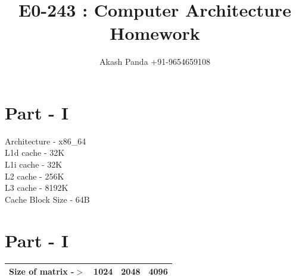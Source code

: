 \documentclass[runningheads]{llncs}
\begin{document}
%
\title{E0-243 : Computer Architecture Homework}
%
%
\author{Akash Panda {+91-9654659108}}
%
%
%
\maketitle              %
%
%
%
%
\section{Part - I}
Architecture - x86\_64 \\
L1d cache - 32K\\
L1i cache - 32K\\
L2 cache - 256K\\
L3 cache - 8192K\\
Cache Block Size - 64B

\section{Part - I}
\begin{tabular}{|c|c|c|c|}
\hline
Size of matrix -$>$ & 1024 & 2048 & 4096\\ 
\hline
\end{tabular}
\end{document}
